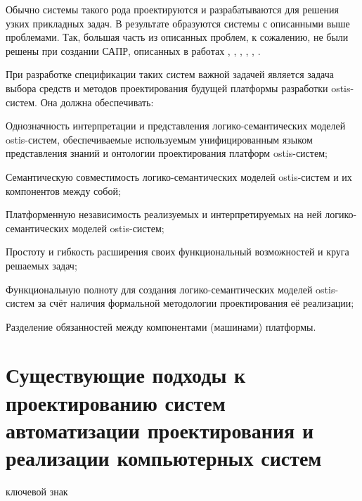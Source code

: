 Обычно системы такого рода проектируются и разрабатываются для решения узких прикладных задач. В результате образуются системы с описанными выше проблемами. Так, большая часть из описанных проблем, к сожалению, не были решены при создании САПР, описанных в работах \cite{lenat1990cyc}, \cite{reed2002mapping}, \cite{Gomolkaa2022}, \cite{Gribova2018}, \cite{Filippov2016}, \cite{Zagorulko2015}.

При разработке спецификации таких систем важной задачей является задача выбора средств и методов проектирования
будущей платформы разработки ostis-систем. Она должна обеспечивать:

\begin{textitemize}
    \item Однозначность интерпретации и представления логико-семантических моделей ostis-систем, обеспечиваемые используемым унифицированным языком представления знаний и онтологии проектирования платформ ostis-систем;
    \item Семантическую совместимость логико-семантических моделей ostis-систем и их компонентов между собой;
    \item Платформенную независимость реализуемых и интерпретируемых на ней логико-семантических моделей ostis-систем;
    \item Простоту и гибкость расширения своих функциональный возможностей и круга решаемых задач;
    \item Функциональную полноту для создания логико-семантических моделей ostis-систем за счёт наличия формальной методологии проектирования её реализации;
    \item Разделение обязанностей между компонентами (машинами) платформы.
\end{textitemize}

\section{Существующие подходы к проектированию систем автоматизации проектирования и реализации компьютерных систем}
\label{sec_soft_platform_problems}

\begin{SCn}

\begin{scnrelfromlist}{ключевой знак}
\end{scnrelfromlist}

\end{SCn}

